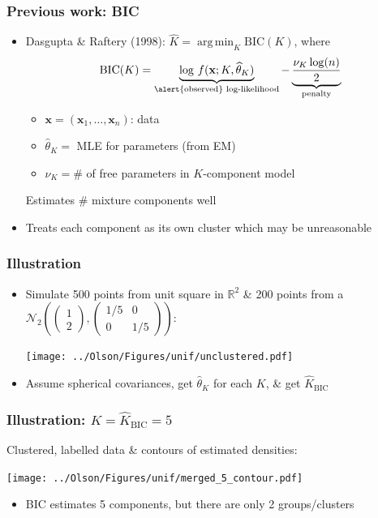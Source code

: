 \documentclass[mathserif,compress]{beamer}
\newcommand*\reals{\mathbb{R}}
\newcommand*\ba{\[ \begin{aligned}}
\newcommand*\ea{\end{aligned} \]}
\newcommand*\estim[1]{\widehat{#1}}
\DeclareMathOperator*{\argmin}{arg\;min}
\renewcommand\;{\,}
\newcommand{\bx}{\mathbf{x}}
\begin{document}
\begin{frame}\frametitle{Previous work: BIC}
\begin{itemize}
\item[]
Dasgupta \& Raftery (1998): $\estim K = \argmin_K \text{BIC}(K)$, where
\ba
\text{BIC}(K)
	= \underbrace{\log \; f(\bx; K, \estim\theta_K)}_\text{\alert{observed} log-likelihood} 
	- \underbrace{\frac{\nu_K \log(n)}{2}}_\text{penalty}
\ea
\begin{itemize}
\item
$\bx = (\bx_1, \dotsc, \bx_n)$: data
\medskip
\item
$\estim\theta_K = $ MLE for parameters (from EM)
\medskip
\item
$\nu_K = \# $ of free parameters in $K$-component model
\end{itemize}
\bigskip
Estimates \# mixture components well
\bigskip
\item[]
Treats each component as its own cluster which may be unreasonable
\end{itemize}
\end{frame}

\begin{frame}\frametitle{Illustration}
\begin{itemize}
\item[]
Simulate 500 points from unit square in $\reals^2$ \& 200 points from a 
$\mathcal N_2\left(\begin{pmatrix} 1 \\ 2 \end{pmatrix},
	\begin{pmatrix} 1/5 & 0 \\ 0 & 1/5 \end{pmatrix}\right)$:
\begin{center}
\texttt{[image: ../Olson/Figures/unif/unclustered.pdf]}
\end{center}
\item[]
Assume spherical covariances, get $\estim\theta_K$  for each $K$, \& get $\estim K_\text{BIC}$
\end{itemize}
\end{frame}

\begin{frame}\frametitle{Illustration: $K = \estim K_\text{BIC} = 5$}
Clustered, labelled data \& contours of estimated densities:
\begin{center}
\texttt{[image: ../Olson/Figures/unif/merged\_5\_contour.pdf]}
\end{center}
\begin{itemize}
\item
BIC estimates 5 components, but there are only 2 groups/clusters
\end{itemize}
\end{frame}
\end{document}
